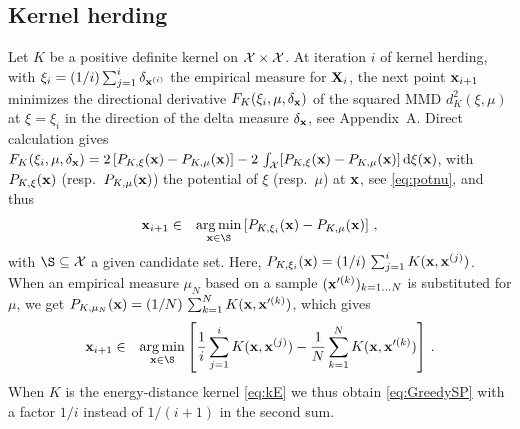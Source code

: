 \subsection{Kernel herding}\label{S:KH}
Let $K$ be a positive definite kernel on $\mathcal{X}\times\mathcal{X}$. 
At iteration $i$ of kernel herding, with $\xi_i=(1/i)\sum_{j=1}^i \delta_{{\bf x}^{(i)}}$ the empirical measure for ${\bf X}_i$, the next point ${\bf x}_{i+1}$ minimizes the directional derivative $F_K(\xi_i,\mu,\delta_{\bf x})$ of the squared MMD $d_K^2(\xi,\mu)$ at $\xi=\xi_i$ in the direction of the delta measure $\delta_{\bf x}$, see Appendix~A. Direct calculation gives
$F_K(\xi_i,\mu,\delta_{\bf x})=2\,[P_{K,\xi}({\bf x})-P_{K,\mu}({\bf x})]-2\,\int_{\mathcal{X}} [P_{K,\xi}({\bf x})-P_{K,\mu}({\bf x})]\,\mathrm{d}\xi({\bf x})$, with $P_{K,\xi}({\bf x})$ (resp.\ $P_{K,\mu}({\bf x})$) the potential of $\xi$ (resp.\ $\mu$) at ${\bf x}$, see \eqref{eq:potnu}, and thus
\begin{eqnarray}\label{eq:KH}
\bx_{i+1} &\in& \argmin_{\bx\in\S} \left[P_{K,\xi_i}(\bx)-P_{K,\mu}(\bx)\right] \,,
\end{eqnarray}
with $\S\subseteq\X$ a given candidate set. 
Here, $P_{K,\xi_i}({\bf x}) = (1/i)\, \sum_{j=1}^i K({\bf x}, {\bf x}^{(j)})$. When an empirical measure $\mu_N$ based on a sample $({\bf x}'^{(k)})_{k=1\ldots N}$ is substituted for $\mu$, we get 
$P_{K,\mu_N}({\bf x}) = (1/N)\, \sum_{k=1}^N K({\bf x}, {\bf x}'^{(k)})$, which gives
\begin{eqnarray*}
\bx_{i+1} &\in& \argmin_{\bx\in\S} \left[ \frac{1}{i} \sum_{j=1}^{i} K(\bx,\bx^{(j)}) - \frac{1}{N} \sum_{k=1}^N K(\bx,\bx'^{(k)}) \right] \,.
\end{eqnarray*}
When $K$ is the energy-distance kernel \eqref{eq:kE} we thus obtain \eqref{eq:GreedySP} with a factor $1/i$ instead of $1/(i+1)$ in the second sum. 

